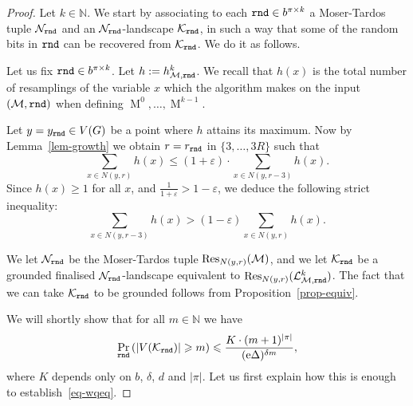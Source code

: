 \documentclass[12pt,a4paper]{article}
\numberwithin{equation}{section}
\theoremstyle{definition}
\newcommand{\eps}{{\varepsilon}}
\newcommand{\de}{{\delta}}
\newcommand{\De}{{\Delta}}
\renewcommand{\ge}{\geqslant}
\renewcommand{\le}{\leqslant}
\newcommand\NN{\mathbb N}
\renewcommand{\cal}[1]{{\mathcal #1}}
\newcommand\MT{\operatorname{M}}
\newcommand\Cl{\operatorname{Cla}}
\newcommand{\me}{\mathrm{e}}
\newcommand{\nn}{R}
\begin{document}
    \begin{proof}
    Let $k\in \NN$. We start by associating to each $\normalfont{\texttt{rnd}}\in b^{\pi\times k}$ a Moser-Tardos tuple $\cal N_{\rnd}$ and an $\cal N_{\rnd}$-landscape $\cal K_{\rnd}$, in such a way that some of the random bits in $\normalfont{\texttt{rnd}}$ can be recovered from $\cal K_{\rnd}$. We do it as follows.
    
    Let us fix $\normalfont{\texttt{rnd}}\in b^{\pi\times k}$. Let $h := h^k_{\cal M,\rnd}$. We recall that $h(x)$ is the total number of resamplings of the variable $x$ which the algorithm makes on the input $(\cal M,\rnd)$  when defining $\MT^0,\ldots, \MT^{k-1}$. 
    
    Let $y=y_{\normalfont{\texttt{rnd}}}\in V(G)$ be a point where $h$ attains its maximum. Now by Lemma~\ref{lem-growth} we obtain $r=r_{\normalfont{\texttt{rnd}}}$ in $\{3,\ldots, 3\nn\}$ such that 
    $$
    \sum_{x\in N(y,r)} h(x)  \le (1+\eps)\cdot \sum_{x\in N(y,r-3)} h(x).
    $$
    Since $h(x)\ge 1$ for all $x$, and $\frac{1}{1+\eps}> 1-\eps$, we deduce the following strict inequality:
    \begin{equation}\label{eq-ssg}
    \sum_{x\in N(y,r-3)} h(x)> (1-\eps)\sum_{x\in N(y,r)} h(x).
    \end{equation}
    
    We let $\cal N_{\rnd}$ be the Moser-Tardos tuple $\Res_{N(y,r)}(\cal M)$, and we let $\cal K_{\rnd}$ be a grounded finalised  $\cal N_{\rnd}$-landscape equivalent to $\Res_{N(y,r)}(\cal L^k_{\cal M, \rnd})$. The fact that we can take $\cal K_{\rnd}$ to be grounded follows from Proposition~\ref{prop-equiv}.
    
    We will shortly show that for all $m\in \NN$ we have 
    \begin{equation}\label{eq-willdo}
    \Pr_{\rnd}\left( |V(\cal K_{\rnd})| \ge m\right) \le \frac{K\cdot (m+1)^{|\pi|}} {(\me\De)^{\de m}},
    \end{equation}
    where $K$ depends only on $b$, $\de$, $d$ and $|\pi|$.  Let us first explain how this is enough to establish~\eqref{eq-wqeq}.  
    

\end{proof}
\end{document}
